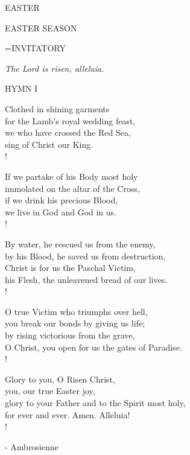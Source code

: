 \begin{center}\normalsize EASTER\\
\end{center}

EASTER SEASON

\hangindent=\parindent \small{INVITATORY}
\begin{center}
\textit{The Lord is risen, alleluia.\\}
\end{center}

\noindent\small{\uppercase{Hymn I}}\normalsize
\begin{cverse}
Clothed in shining garments\\
for the Lamb's royal wedding feast,\\
we who have crossed the Red Sea,\\
sing of Christ our King.\\!

If we partake of his Body most holy\\
immolated on the altar of the Cross,\\
if we drink his precious Blood,\\
we live in God and God in us.\\!

By water, he rescued us from the enemy,\\
by his Blood, he saved us from destruction,\\
Christ is for us the Paschal Victim,\\
his Flesh, the unleavened bread of our lives.\\!

O true Victim who triumphs over hell,\\
you break our bonds by giving us life;\\
by rising victorious from the grave,\\
O Christ, you open for us the gates of Paradise.\\!

Glory to you, O Risen Christ,\\
you, our true Easter joy,\\
glory to your Father and to the Spirit most holy,\\
for ever and ever. Amen. Alleluia!\\!
\end{cverse}

- Ambrosienne

